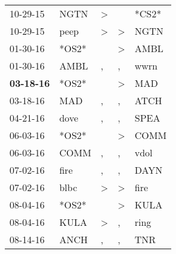 \begin{supertabular}{p{0.07\textwidth}p{0.06\textwidth}p{0.02\textwidth}p{0.02\textwidth}p{0.06\textwidth}}
          10-29-15\textsuperscript{} &           NGTN\textsuperscript{} &     \textgreater &                  &                            *CS2* \\
          10-29-15\textsuperscript{} &           peep\textsuperscript{} &     \textgreater &     \textgreater &           NGTN\textsuperscript{} \\
          01-30-16\textsuperscript{} &                            *OS2* &                  &     \textgreater &           AMBL\textsuperscript{} \\
          01-30-16\textsuperscript{} &           AMBL\textsuperscript{} &                , &                , &           wwrn\textsuperscript{} \\
 \textbf{03-18-16\textsuperscript{}} &                            *OS2* &                  &     \textgreater &            MAD\textsuperscript{} \\
          03-18-16\textsuperscript{} &            MAD\textsuperscript{} &                , &                , &           ATCH\textsuperscript{} \\
          04-21-16\textsuperscript{} &           dove\textsuperscript{} &                , &                , &           SPEA\textsuperscript{} \\
          06-03-16\textsuperscript{} &                            *OS2* &                  &     \textgreater &           COMM\textsuperscript{} \\
          06-03-16\textsuperscript{} &           COMM\textsuperscript{} &                , &                , &           vdol\textsuperscript{} \\
          07-02-16\textsuperscript{} &           fire\textsuperscript{} &                , &                , &           DAYN\textsuperscript{} \\
          07-02-16\textsuperscript{} &           blbc\textsuperscript{} &     \textgreater &     \textgreater &           fire\textsuperscript{} \\
          08-04-16\textsuperscript{} &                            *OS2* &                  &     \textgreater &           KULA\textsuperscript{} \\
          08-04-16\textsuperscript{} &           KULA\textsuperscript{} &     \textgreater &                , &           ring\textsuperscript{} \\
          08-14-16\textsuperscript{} &           ANCH\textsuperscript{} &                , &                , &            TNR\textsuperscript{} \\

\end{supertabular}
